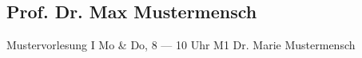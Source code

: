 
\subsection*{Prof. Dr. Max Mustermensch}

\vorlesungsdaten
	{Mustervorlesung I}%
	{Mo \& Do, 8 --- 10 Uhr}%
	{M1}%
	{Dr. Marie Mustermensch}%
	{}%
\vspace{-\baselineskip}
\lipsum[1]

\lipsum[2-3]

\enlargethispage*{\baselineskip}
